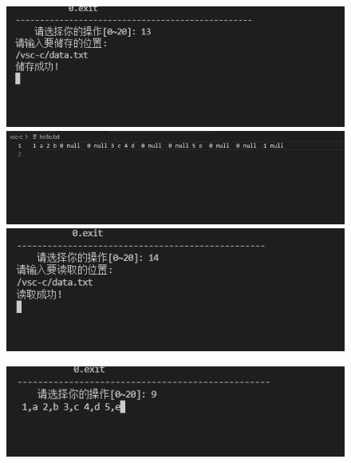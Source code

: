\documentclass[supercite]{Experimental_Report}
\theoremstyle{definition}
\begin{document}
\begin{itemize}
	      \begin{figure}[htbp]
		      \centering
		      \begin{minipage}{0.9\linewidth}
			      \centering
			      \includegraphics[width=0.9\linewidth]{images/test-99.png}
		      \end{minipage}
		      \begin{minipage}{0.9\linewidth}
			      \centering
			      \includegraphics[width=0.9\linewidth]{images/test-98.png}
		      \end{minipage}
		      \begin{minipage}{0.9\linewidth}
			      \centering
			      \includegraphics[width=0.9\linewidth]{images/test-100.png}
		      \end{minipage}
	      \end{figure}
	      \begin{figure}[htbp]
		      \centering
		      \begin{minipage}{0.9\linewidth}
			      \centering
			      \includegraphics[width=0.9\linewidth]{images/test-101.png}

\end{minipage}
\end{figure}
\end{itemize}
\end{document}
